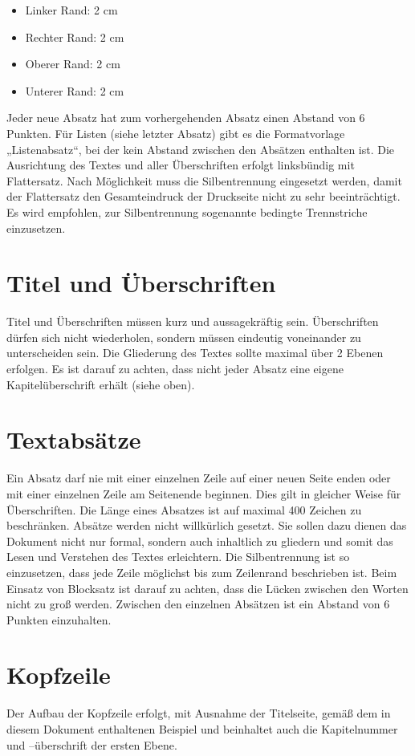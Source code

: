 \begin{itemize}
	\item Linker Rand: 2 cm
	\item Rechter Rand: 2 cm
	\item Oberer Rand: 2 cm
	\item Unterer Rand: 2 cm
\end{itemize}

Jeder neue Absatz hat zum vorhergehenden Absatz einen Abstand von 6 Punkten. Für Listen (siehe letzter Absatz) gibt es die Formatvorlage „Listenabsatz“, bei der kein Abstand zwischen den Absätzen enthalten ist.
Die Ausrichtung des Textes und aller Überschriften erfolgt linksbündig mit Flattersatz. Nach Möglichkeit muss die Silbentrennung eingesetzt werden, damit der Flattersatz den Gesamteindruck der Druckseite nicht zu sehr beeinträchtigt. Es wird empfohlen, zur Silbentrennung sogenannte bedingte Trennstriche einzusetzen.

\section{Titel und Überschriften}

Titel und Überschriften müssen kurz und aussagekräftig sein. Überschriften dürfen sich nicht wiederholen, sondern müssen eindeutig voneinander zu unterscheiden sein.
Die Gliederung des Textes sollte maximal über 2 Ebenen erfolgen. Es ist darauf zu achten, dass nicht jeder Absatz eine eigene Kapitelüberschrift erhält (siehe oben).

\section{Textabsätze}

Ein Absatz darf nie mit einer einzelnen Zeile auf einer neuen Seite enden oder mit einer einzelnen Zeile am Seitenende beginnen. Dies gilt in gleicher Weise für Überschriften.
Die Länge eines Absatzes ist auf maximal 400 Zeichen zu beschränken.
Absätze werden nicht willkürlich gesetzt. Sie sollen dazu dienen das Dokument nicht nur formal, sondern auch inhaltlich zu gliedern und somit das Lesen und Verstehen des Textes erleichtern.
Die Silbentrennung ist so einzusetzen, dass jede Zeile möglichst bis zum Zeilenrand beschrieben ist. Beim Einsatz von Blocksatz ist darauf zu achten, dass die Lücken zwischen den Worten nicht zu groß werden.
Zwischen den einzelnen Absätzen ist ein Abstand von 6 Punkten einzuhalten.

\section{Kopfzeile}
Der Aufbau der Kopfzeile erfolgt, mit Ausnahme der Titelseite, gemäß dem in diesem Dokument enthaltenen Beispiel und beinhaltet auch die Kapitelnummer und –überschrift der ersten Ebene.

